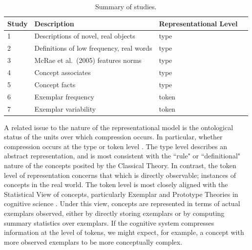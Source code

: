 \begin{table}[t]
\footnotesize
\centering
\begin{tabular}{l l l l  }
 \toprule
 \textbf{Study} &  \textbf{Description} & \textbf{Representational Level}  \\
 \toprule

1  & Descriptions of novel, real objects & type   \\
2  & Definitions of low frequency, real words & type \\
3  & McRae et al.\ (2005) features norms & type  \\
4  & Concept associates & type    \\
5  & Concept facts & type  \\
6  & Exemplar frequency& token   \\
7  & Exemplar variability & token  \\
 \bottomrule
\end{tabular}
\caption{Summary of studies.}
\label{tab:complexity_pred_summary_table}
\end{table}



 
A related issue to the nature of the representational model is the ontological status of the units over which compression occurs. In particular, whether compression occurs at the type or token level \cite{peirce}. The type level describes an abstract representation, and is most consistent with the ``rule" or ``definitional" nature of the concepts posited by the Classical Theory. In contrast, the token level of representation concerns that which is directly observable; instances of concepts in the real world.  The token level is most closely aligned with the Statistical View of concepts, particularly Exemplar and Prototype Theories in cognitive science  \cite{laurence1999concepts}. Under this view, concepts are represented in terms of actual exemplars observed, either by directly storing exemplars or by computing summary statistics over exemplars. If the cognitive system compresses information at the level of tokens, we might expect, for example, a concept with more observed exemplars to be more conceptually complex. 

